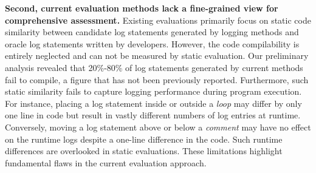 \textbf{Second, current evaluation methods lack a fine-grained view for comprehensive assessment.}
Existing evaluations primarily focus on static code similarity between candidate log statements generated by logging methods and oracle log statements written by developers.
However, the code compilability is entirely neglected and can not be measured by static evaluation.
Our preliminary analysis revealed that 20\%-80\% of log statements generated by current methods fail to compile, a figure that has not been previously reported.
Furthermore, such static similarity fails to capture logging performance during program execution.
For instance, placing a log statement inside or outside a \textit{loop} may differ by only one line in code but result in vastly different numbers of log entries at runtime. Conversely, moving a log statement above or below a \textit{comment} may have no effect on the runtime logs despite a one-line difference in the code. Such runtime differences are overlooked in static evaluations.
These limitations highlight fundamental flaws in the current evaluation approach.


